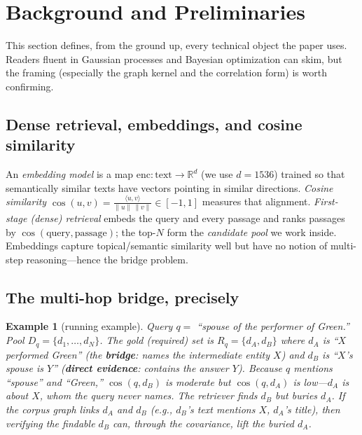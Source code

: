 \documentclass[11pt]{article}
\newtheorem{example}{Example}
\newcommand{\R}{\mathbb{R}}
\begin{document}
\section{Background and Preliminaries}\label{sec:prelim}
This section defines, from the ground up, every technical object the paper uses. Readers fluent in Gaussian
processes and Bayesian optimization can skim, but the framing (especially the graph kernel and the correlation
form) is worth confirming.

\subsection{Dense retrieval, embeddings, and cosine similarity}
An \emph{embedding model} is a map $\text{enc}:\text{text}\to\R^d$ (we use $d=1536$) trained so that
semantically similar texts have vectors pointing in similar directions. \emph{Cosine similarity}
$\cos(u,v)=\frac{\langle u,v\rangle}{\|u\|\,\|v\|}\in[-1,1]$ measures that alignment. \emph{First-stage (dense)
retrieval} embeds the query and every passage and ranks passages by $\cos(\text{query},\text{passage})$; the
top-$N$ form the \emph{candidate pool} we work inside. Embeddings capture topical/semantic similarity well but
have no notion of multi-step reasoning---hence the bridge problem.

\subsection{The multi-hop bridge, precisely}
\begin{example}[running example]\label{ex:run}
Query $q=$ ``spouse of the performer of Green.'' Pool $D_q=\{d_1,\dots,d_N\}$. The gold (required) set is
$R_q=\{d_A,d_B\}$ where $d_A$ is ``$X$ performed \emph{Green}'' (the \textbf{bridge}: names the intermediate
entity $X$) and $d_B$ is ``$X$'s spouse is $Y$'' (\textbf{direct evidence}: contains the answer $Y$). Because
$q$ mentions ``spouse'' and ``Green,'' $\cos(q,d_B)$ is moderate but $\cos(q,d_A)$ is low---$d_A$ is about $X$,
whom the query never names. The retriever finds $d_B$ but buries $d_A$. If the corpus graph links $d_A$ and
$d_B$ (e.g., $d_B$'s text mentions $X$, $d_A$'s title), then verifying the findable $d_B$ can, through the
covariance, lift the buried $d_A$.
\end{example}
\end{document}
